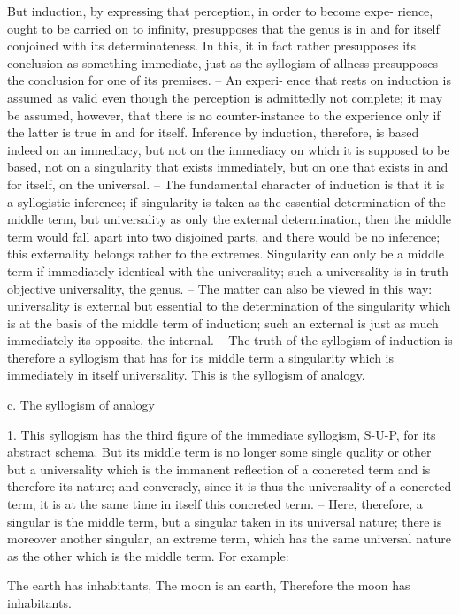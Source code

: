 But induction, by expressing that perception, in order to become expe-
rience, ought to be carried on to infinity, presupposes that the genus is in
and for itself conjoined with its determinateness. In this, it in fact rather
presupposes its conclusion as something immediate, just as the syllogism
of allness presupposes the conclusion for one of its premises. – An experi-
ence that rests on induction is assumed as valid even though the perception
is admittedly not complete; it may be assumed, however, that there is no
counter-instance to the experience only if the latter is true in and for itself.
Inference by induction, therefore, is based indeed on an immediacy, but
not on the immediacy on which it is supposed to be based, not on a
singularity that exists immediately, but on one that exists in and for itself,
on the universal. – The fundamental character of induction is that it is a
syllogistic inference; if singularity is taken as the essential determination of
the middle term, but universality as only the external determination, then
the middle term would fall apart into two disjoined parts, and there would
be no inference; this externality belongs rather to the extremes. Singularity
can only be a middle term if immediately identical with the universality;
such a universality is in truth objective universality, the genus. – The matter
can also be viewed in this way: universality is external but essential to the
determination of the singularity which is at the basis of the middle term of
induction; such an external is just as much immediately its opposite, the
internal. – The truth of the syllogism of induction is therefore a syllogism
that has for its middle term a singularity which is immediately in itself
universality. This is the syllogism of analogy.

c. The syllogism of analogy

1. This syllogism has the third figure of the immediate syllogism, S-U-P, for
its abstract schema. But its middle term is no longer some single quality or
other but a universality which is the immanent reflection of a concreted term
and is therefore its nature; and conversely, since it is thus the universality of
a concreted term, it is at the same time in itself this concreted term. – Here,
therefore, a singular is the middle term, but a singular taken in its universal
nature; there is moreover another singular, an extreme term, which has the
same universal nature as the other which is the middle term. For example:

The earth has inhabitants,
The moon is an earth,
Therefore the moon has inhabitants.

